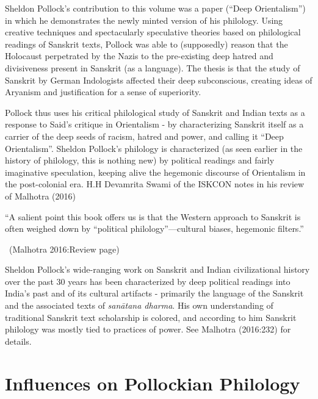 \vskip 3pt

Sheldon Pollock’s contribution to this volume was a paper (“Deep Orientalism”) in which he demonstrates the newly minted version of his philology. Using creative techniques and spectacularly speculative theories based on philological readings of Sanskrit texts, Pollock was able to (supposedly) reason that the Holocaust perpetrated by the Nazis to the pre-existing deep hatred and divisiveness present in Sanskrit (as a language). The thesis is that the study of Sanskrit by German Indologists affected their deep subconscious, creating ideas of Aryanism and justification for a sense of superiority.

\vskip 3pt

Pollock thus uses his critical philological study of Sanskrit and Indian texts as a response to Said’s critique in Orientalism - by characterizing Sanskrit itself as a carrier of the deep seeds of racism, hatred and power, and calling it “Deep Orientalism”. Sheldon Pollock’s philology is characterized (as seen earlier in the history of philology, this is nothing new) by political readings and fairly imaginative speculation, keeping alive the hegemonic discourse of Orientalism in the post-colonial era. H.H Devamrita Swami of the ISKCON notes in his review of Malhotra (2016)

\vskip 3pt

\begin{myquote}
“A salient point this book offers us is that the Western approach to Sanskrit is often weighed down by “political philology”—cultural biases, hegemonic filters.”

~\hfill (Malhotra 2016:Review page)
\end{myquote}

\vskip 3pt

Sheldon Pollock’s wide-ranging work on Sanskrit and Indian civilizational history over the past 30 years has been characterized by deep political readings into India’s past and of its cultural artifacts - primarily the language of the Sanskrit and the associated texts of \textit{sanātana dharma}. His own understanding of traditional Sanskrit text scholarship is colored, and according to him Sanskrit philology was mostly tied to practices of power. See Malhotra (2016:232) for details.


\section*{Influences on Pollockian Philology}

